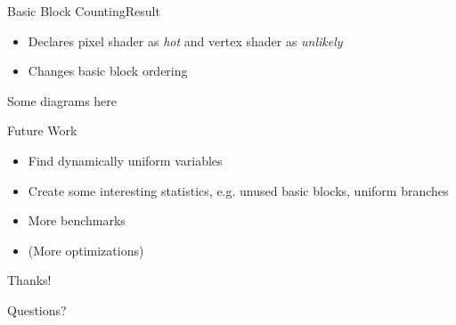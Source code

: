\documentclass[xcolor={usenames,dvipsnames}, aspectratio=169, 12pt]{beamer}
\begin{document}
{\framelogo{\centering}
\begin{frame}{Basic Block Counting}{Result}
\begin{itemize}
	\item Declares pixel shader as \emph{hot} and vertex shader as \emph{unlikely}
	\item Changes basic block ordering
\end{itemize}
Some diagrams here
\end{frame}}

{\framelogo{\centering}
\begin{frame}{Future Work}
\begin{itemize}
	\item Find dynamically uniform variables
	\item Create some interesting statistics, e.g. unused basic blocks, uniform branches
	\item More benchmarks
	\item (More optimizations)
\end{itemize}
\end{frame}}

\begin{tumplainframe}{Thanks!}
\begin{center}
	\Huge Questions?
\end{center}
\end{tumplainframe}
\end{document}
